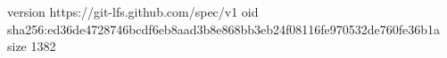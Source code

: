 version https://git-lfs.github.com/spec/v1
oid sha256:ed36de4728746bcdf6eb8aad3b8e868bb3eb24f08116fe970532de760fe36b1a
size 1382
